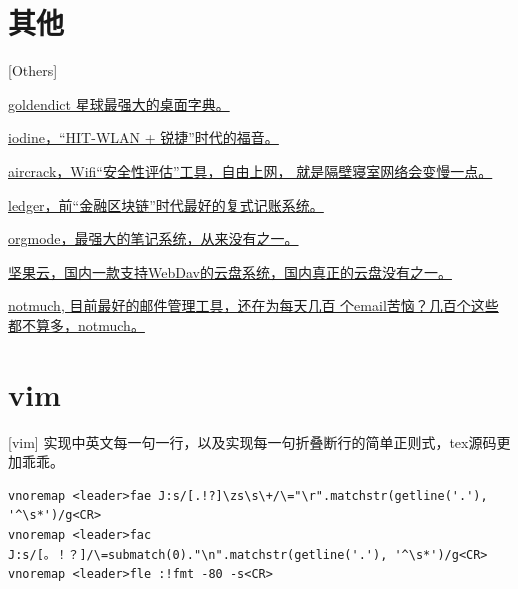 \section{其他}[Others]

\href{https://github.com/goldendict/goldendict}{goldendict 星球最强大的桌面字典。}

\href{https://github.com/yarrick/iodine}{iodine，“HIT-WLAN + 锐捷”时代的福音。}

\href{http://www.aircrack-ng.org/}{aircrack，Wifi“安全性评估”工具，自由上网，
  就是隔壁寝室网络会变慢一点。}

\href{https://www.ledger-cli.org/}{ledger，前“金融区块链”时代最好的复式记账系统。}

\href{https://orgmode.org/}{orgmode，最强大的笔记系统，从来没有之一。}

\href{https://www.jianguoyun.com/}{坚果云，国内一款支持WebDav的云盘系统，国内真正的云盘没有之一。}

\href{https://notmuchmail.org/}{notmuch, 目前最好的邮件管理工具，还在为每天几百
  个email苦恼？几百个这些都不算多，notmuch。}

\section{vim}[vim]
实现中英文每一句一行，以及实现每一句折叠断行的简单正则式，tex源码更加乖乖。
\begin{lstlisting}
vnoremap <leader>fae J:s/[.!?]\zs\s\+/\="\r".matchstr(getline('.'), '^\s*')/g<CR>
vnoremap <leader>fac J:s/[。！？]/\=submatch(0)."\n".matchstr(getline('.'), '^\s*')/g<CR>
vnoremap <leader>fle :!fmt -80 -s<CR>
\end{lstlisting}
